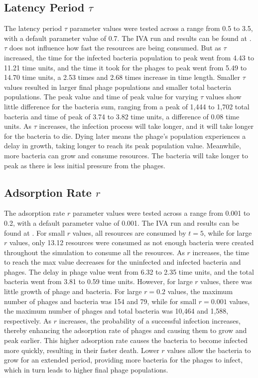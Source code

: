 \subsection{Latency Period $\tau$}
The latency period $\tau$ parameter values were tested across a range from 0.5 to 3.5, with a default parameter value of 0.7. 
The IVA run and results can be found at . 
$\tau$ does not influence how fast the resources are being consumed. 
But as $\tau$ increased, the time for the infected bacteria population to peak went from 4.43 to 11.21 time units, and the time it took for the phages to peak went from 5.49 to 14.70 time units, a 2.53 times and 2.68 times increase in time length. 
Smaller $\tau$ values resulted in larger final phage populations and smaller total bacteria populations. 
The peak value and time of peak value for varying $\tau$ values show little difference for the bacteria sum, ranging from a peak of 1,444 to 1,702 total bacteria and time of peak of 3.74 to 3.82 time units, a difference of 0.08 time units. 
As $\tau$ increases, the infection process will take longer, and it will take longer for the bacteria to die. 
Dying later means the phage's population experiences a delay in growth, taking longer to reach its peak population value. 
Meanwhile, more bacteria can grow and consume resources. 
The bacteria will take longer to peak as there is less initial pressure from the phages. 

\subsection{Adsorption Rate $r$}
The adsorption rate $r$ parameter values were tested across a range from 0.001 to 0.2, with a default parameter value of 0.001. 
The IVA run and results can be found at . 
For small $r$ values, all resources are consumed by $t=5$, while for large $r$ values, only 13.12 resources were consumed as not enough bacteria were created throughout the simulation to consume all the resources. 
As $r$ increases, the time to reach the max value decreases for the uninfected and infected bacteria and phages. The delay in phage value went from 6.32 to 2.35 time units, and the total bacteria went from 3.81 to 0.59 time units. 
However, for large $r$ values, there was little growth of phage and bacteria. 
For large $r=0.2$ values, the maximum number of phages and bacteria was 154 and 79, while for small $r=0.001$ values, the maximum number of phages and total bacteria was 10,464 and 1,588, respectively. 
As $r$ increases, the probability of a successful infection increases, thereby enhancing the adsorption rate of phages and causing them to grow and peak earlier. 
This higher adsorption rate causes the bacteria to become infected more quickly, resulting in their faster death. 
Lower $r$ values allow the bacteria to grow for an extended period, providing more bacteria for the phages to infect, which in turn leads to higher final phage populations.

